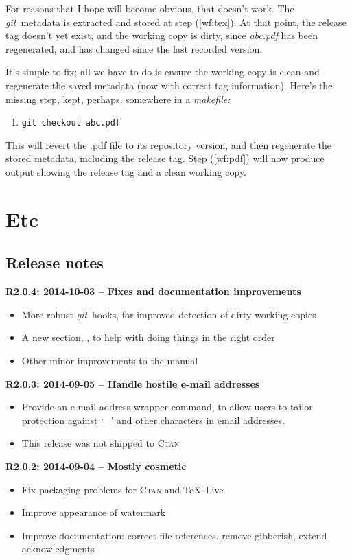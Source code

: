 \documentclass[a4paper,12pt,twoside,openany]{memoir}
\newcommand{\rpara}[1]{\par\noindent\textbf{#1}\,}
\newcommand{\sfit}[1]{\textit{#1}}
\newcommand{\git}{\sfit{git}}
\begin{document}
\noindent For reasons that I hope will become obvious,
that doesn't work.
The \git\ metadata is extracted and stored at step (\ref{wf:tex}).
At that point, the release tag doesn't yet exist,
and the working copy is dirty,
since \sfit{abc.pdf} has been regenerated, and has changed
since the last recorded version.

It's simple to fix; all we have to do is
ensure the working copy is clean and regenerate
the saved metadata (now with correct tag information).
Here's the missing step, kept, perhaps, somewhere in a \sfit{makefile:}

\begin{enumerate}
\item[\ref{wf:git}.] \texttt{git checkout abc.pdf}
\end{enumerate}

\noindent This will revert the .pdf file to its repository version,
and then regenerate the stored metadata,
including the release tag.
Step (\ref{wf:pdf}) will now produce output showing the release tag
and a clean working copy.
\chapter{Etc}
\section{Release notes}

\rpara{R2.0.4: 2014-10-03 -- Fixes and documentation improvements}
\begin{itemize}
\item More robust \git\ hooks,
for improved detection of dirty working copies
\item A new section, \textit{},
to help with doing things in the right order
\item Other minor improvements to the manual
\end{itemize}

\rpara{R2.0.3: 2014-09-05 -- Handle hostile e-mail addresses}
\begin{itemize}
\item Provide an e-mail address wrapper command,
to allow users to tailor protection
against `\_' and other characters in email addresses.
\item This release was not shipped to \textsc{Ctan}
\end{itemize}

\rpara{R2.0.2: 2014-09-04 -- Mostly cosmetic}
\begin{itemize}
\item Fix packaging problems for \textsc{Ctan} and \TeX{}~Live
\item Improve appearance of watermark
\item Improve documentation: correct file references. remove gibberish, extend acknowledgments
\end{itemize}
\end{document}
